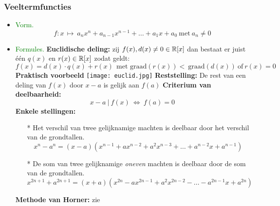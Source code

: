 \subsubsection{Veeltermfuncties} \label{veeltermfuncties}
		\begin{itemize}%
		\item \textcolor{green}{Vorm.}
		\[f:x\, \mapsto \: a_nx^n+a_{n-1}x^{n-1}+\ldots +a_1x+a_0\:\mbox{met} \:a_n\neq 0\]
		\item \textcolor{green}{Formules.}\newline
		\hypertarget{euclidische_deling}{{\bf Euclidische deling:}}\label{euclidische_deling} zij $f(x), d(x) \neq 0 \in\mathbb{R} 		[x]$ dan bestaat er juist \'e\'en $q(x)$ en $r(x) \in\mathbb{R} [x]$ zodat geldt:
		 \[f(x)=d(x)\cdot q(x)+r(x)\:\:\mbox{met 		graad}(r(x))<\:\mbox{graad}(d(x))\:\mbox{of}\:r(x)=0\]\newline
		{\bf Praktisch voorbeeld}\newline
                \texttt{[image: euclid.jpg]}
		\hypertarget{reststelling}{{\bf Reststelling:}}\label{reststelling} De rest van een deling van $f(x)$ door $x-a$ 		is gelijk aan $f(a)$\newline\newline
		{\bf Criterium van deelbaarheid:} \[x-a \: |\: f(x)\:\Leftrightarrow\: f(a)=0\]
		\hypertarget{merkwaardige_quotienten}{{\bf Enkele stellingen:}}\label{merkwaardige_quotienten} 
		\begin{itemize}
		\item[*]Het verschil van twee gelijknamige machten is deelbaar door het verschil van 		de grondtallen.
		\[x^n-a^n=(x-a)(x^{n-1}+ax^{n-2}+a^2x^{n-3}+\ldots+a^{n-2}x+a^{n-1})\]
		\item[*]De som van twee gelijknamige {\it oneven} machten is deelbaar door de som 		van de grondtallen.
		\[x^{2n+1}+a^{2n+1}=(x+a)(x^{2n}-ax^{2n-1}+a^2x^{2n-2}-\ldots-a^{2n-1}x+a^{2n})\]
		\end{itemize}
		{\bf Methode van Horner:} zie %
		\end{itemize}%

\hypertarget{rationale_functies}{}
